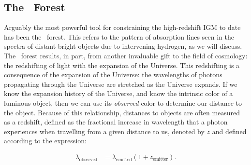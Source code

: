 \subsection{The \lya\ Forest}\label{sec:LyaForest}
Arguably the most powerful tool for constraining the high-redshift IGM to date has been the \lya\ forest. This refers to the pattern of absorption lines seen in the spectra of distant bright objects due to intervening hydrogen, as we will discuss. The \lya\ forest results, in part, from another invaluable gift to the field of cosmology: the redshifting of light with the expansion of the Universe. This redshifting is a consequence of the expansion of the Universe: the wavelengths of photons propagating through the Universe are stretched as the Universe expands. If we know the expansion history of the Universe, and know the intrinsic color of a luminous object, then we can use its \textit{observed} color to determine our distance to the object. Because of this relationship, distances to objects are often measured as a redshift, defined as the fractional increase in wavelength that a photon experiences when travelling from a given distance to us, denoted by $z$ and defined according to the expression: 

\begin{align}
\lambda_{\text{observed}} &= \lambda_{\text{emitted}}(1+z_{\text{emitter}}). 
\end{align}

